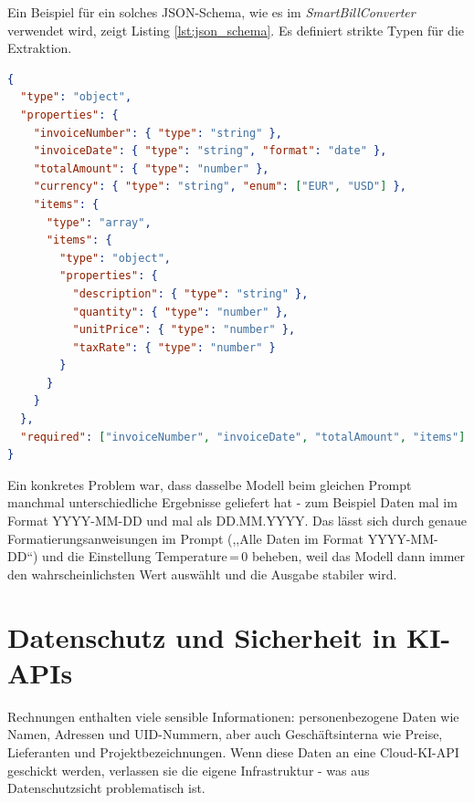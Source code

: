 Ein Beispiel für ein solches JSON-Schema, wie es im \textit{SmartBillConverter} verwendet wird, zeigt Listing \ref{lst:json_schema}. Es definiert strikte Typen für die Extraktion.

\begin{lstlisting}[language=json, caption={JSON-Schema für die KI-Extraktion}, label={lst:json_schema}]
{
  "type": "object",
  "properties": {
    "invoiceNumber": { "type": "string" },
    "invoiceDate": { "type": "string", "format": "date" },
    "totalAmount": { "type": "number" },
    "currency": { "type": "string", "enum": ["EUR", "USD"] },
    "items": {
      "type": "array",
      "items": {
        "type": "object",
        "properties": {
          "description": { "type": "string" },
          "quantity": { "type": "number" },
          "unitPrice": { "type": "number" },
          "taxRate": { "type": "number" }
        }
      }
    }
  },
  "required": ["invoiceNumber", "invoiceDate", "totalAmount", "items"]
}
\end{lstlisting}

Ein konkretes Problem war, dass dasselbe Modell beim gleichen Prompt manchmal unterschiedliche Ergebnisse geliefert hat - zum Beispiel Daten mal im Format YYYY-MM-DD und mal als DD.MM.YYYY. Das lässt sich durch genaue Formatierungsanweisungen im Prompt (,,Alle Daten im Format YYYY-MM-DD``) und die Einstellung Temperature\,=\,0 beheben, weil das Modell dann immer den wahrscheinlichsten Wert auswählt und die Ausgabe stabiler wird.

\section{Datenschutz und Sicherheit in KI-APIs}
\label{sec:ai_security}

Rechnungen enthalten viele sensible Informationen: personenbezogene Daten wie Namen, Adressen und UID-Nummern, aber auch Geschäftsinterna wie Preise, Lieferanten und Projektbezeichnungen. Wenn diese Daten an eine Cloud-KI-API geschickt werden, verlassen sie die eigene Infrastruktur - was aus Datenschutzsicht problematisch ist.

